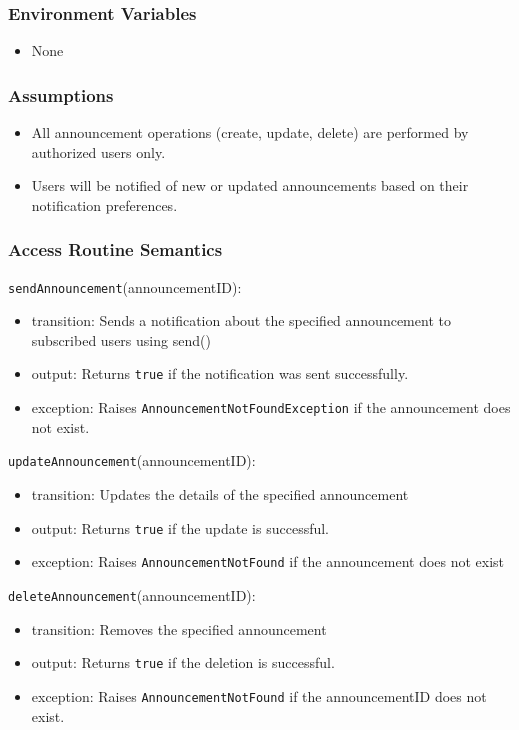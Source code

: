 \documentclass[12pt, titlepage]{article}
\begin{document}
\subsubsection{Environment Variables}
\begin{itemize}
    \item None
\end{itemize}

\subsubsection{Assumptions}
\begin{itemize}
    \item All announcement operations (create, update, delete) are performed by authorized users only.
    \item Users will be notified of new or updated announcements based on their notification preferences.
\end{itemize}

\subsubsection{Access Routine Semantics}

\noindent \texttt{sendAnnouncement}(announcementID):  
\begin{itemize}
    \item transition: Sends a notification about the specified announcement to subscribed users using send()
    \item output: Returns \texttt{true} if the notification was sent successfully.
    \item exception: Raises \texttt{AnnouncementNotFoundException} if the announcement does not exist.
\end{itemize}

\noindent \texttt{updateAnnouncement}(announcementID):  
\begin{itemize}
    \item transition: Updates the details of the specified announcement
    \item output: Returns \texttt{true} if the update is successful.
    \item exception: Raises \texttt{AnnouncementNotFound} if the announcement does not exist
\end{itemize}

\noindent \texttt{deleteAnnouncement}(announcementID):  
\begin{itemize}
    \item transition: Removes the specified announcement
    \item output: Returns \texttt{true} if the deletion is successful.
    \item exception: Raises \texttt{AnnouncementNotFound} if the announcementID does not exist.
\end{itemize}
\end{document}
